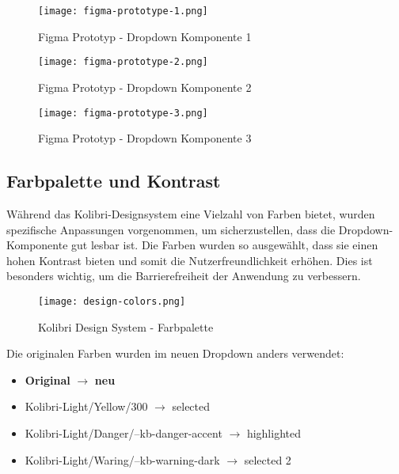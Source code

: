 \begin{figure}[!htb]
    \centering
    \texttt{[image: figma-prototype-1.png]}
    \caption{Figma Prototyp - Dropdown Komponente 1}
    \label{Abbildung:figmaPrototype1}
\end{figure}
 
\begin{figure}[!htb]
    \centering
    \texttt{[image: figma-prototype-2.png]}
    \caption{Figma Prototyp - Dropdown Komponente 2}
    \label{Abbildung:figmaPrototype2}
\end{figure}
 
\begin{figure}[!htb]
    \centering
    \texttt{[image: figma-prototype-3.png]}
    \caption{Figma Prototyp - Dropdown Komponente 3}
    \label{Abbildung:figmaPrototype3}
\end{figure}


\subsection{Farbpalette und Kontrast}

Während das Kolibri-Designsystem eine Vielzahl von Farben bietet, wurden spezifische Anpassungen vorgenommen, um sicherzustellen, dass die Dropdown-Komponente gut lesbar ist. 
Die Farben wurden so ausgewählt, dass sie einen hohen Kontrast bieten und somit die Nutzerfreundlichkeit erhöhen. Dies ist besonders wichtig, um die Barrierefreiheit der Anwendung zu verbessern.

\begin{figure}[!htb]
    \centering
    \texttt{[image: design-colors.png]}
    \caption{Kolibri Design System - Farbpalette}
    \label{Abbildung:designColors}
\end{figure}

Die originalen Farben wurden im neuen Dropdown anders verwendet:

\begin{itemize}
    \item \textbf{Original} $\rightarrow$ \textbf{neu}
    \item Kolibri-Light/Yellow/300 $\rightarrow$ selected
    \item Kolibri-Light/Danger/--kb-danger-accent $\rightarrow$ highlighted
    \item Kolibri-Light/Waring/--kb-warning-dark $\rightarrow$ selected 2
\end{itemize}

